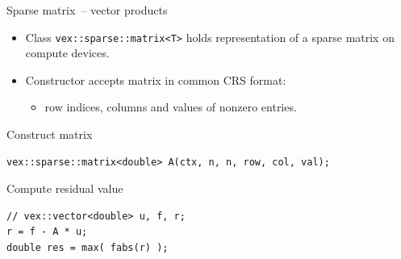 \documentclass[@BEAMER_OPTIONS@]{beamer}
\newcommand{\code}[1]{\lstinline|#1|}
\begin{document}
\begin{frame}[fragile]{Sparse matrix~-- vector products}
    \begin{itemize}
        \item Class \code{vex::sparse::matrix<T>} holds representation of a
            sparse matrix on compute devices.
        \item Constructor accepts matrix in common CRS format:
            \begin{itemize}
                \item row indices, columns and values of nonzero entries.
            \end{itemize}
    \end{itemize}
    \begin{exampleblock}{Construct matrix}
        \begin{lstlisting}
vex::sparse::matrix<double> A(ctx, n, n, row, col, val);
        \end{lstlisting}
    \end{exampleblock}

    \begin{exampleblock}{Compute residual value}
        \begin{lstlisting}[firstnumber=last]
// vex::vector<double> u, f, r;
r = f - A * u;
double res = max( fabs(r) );
        \end{lstlisting}
    \end{exampleblock}
\end{frame}

\end{document}
